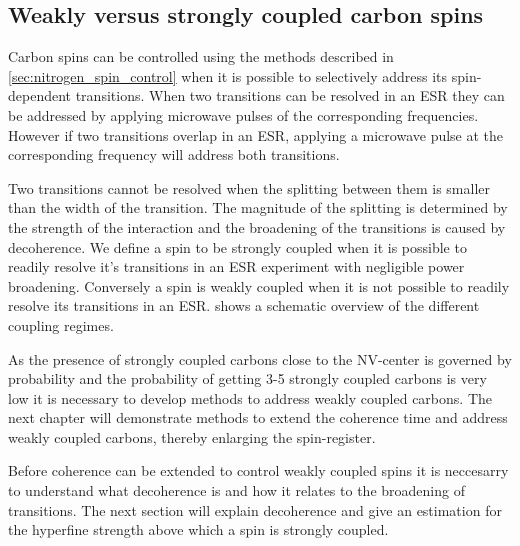 \subsection{Weakly versus strongly coupled carbon spins}
Carbon spins can be controlled using the methods described in \cref{sec:nitrogen_spin_control} when it is possible to selectively address its spin-dependent transitions.
When two transitions can be resolved in an ESR they can be addressed by applying microwave pulses of the corresponding frequencies.
However if two transitions overlap in an ESR, applying a microwave pulse at the corresponding frequency will address both transitions.

Two transitions cannot be resolved when the splitting between them is smaller than the width of the transition.
The magnitude of the splitting is determined by the strength of the interaction and the broadening of the transitions is caused by decoherence.
We define a spin to be strongly coupled when it is possible to readily resolve it's transitions in an ESR experiment with negligible power broadening.
Conversely a spin is weakly coupled when it is not possible to readily resolve its transitions in an ESR.
 shows a schematic overview of the different coupling regimes.

As the presence of strongly coupled carbons close to the NV-center is governed by probability and the probability of getting 3-5 strongly coupled carbons is very low it is necessary to develop methods to address weakly coupled carbons.
The next chapter will demonstrate methods to extend the coherence time and address weakly coupled carbons, thereby enlarging the spin-register.

Before coherence can be extended to control weakly coupled spins it is neccesarry to understand what decoherence is and how it relates to the broadening of transitions.
The next section will explain decoherence and give an estimation for the hyperfine strength above which a spin is strongly coupled.

